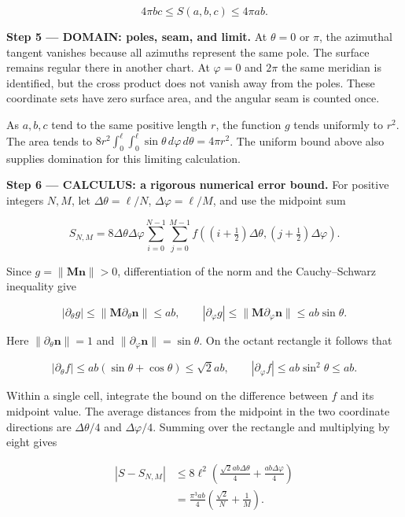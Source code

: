\documentclass[11pt,oneside,openany]{book}
\begin{document}
\[
4\pi bc\le S(a,b,c)\le4\pi ab.
\]

\begin{DomainStep}
\textbf{Step 5 --- DOMAIN: poles, seam, and limit.} At \(\theta=0\) or \(\pi\), the azimuthal tangent vanishes because all azimuths represent the same pole. The surface remains regular there in another chart. At \(\varphi=0\) and \(2\pi\) the same meridian is identified, but the cross product does not vanish away from the poles. These coordinate sets have zero surface area, and the angular seam is counted once.

As \(a,b,c\) tend to the same positive length \(r\), the function \(g\) tends uniformly to \(r^2\). The area tends to \(8r^2\int_0^\ell\int_0^\ell\sin\theta\,d\varphi\,d\theta=4\pi r^2\). The uniform bound above also supplies domination for this limiting calculation.

\end{DomainStep}
\textbf{Step 6 --- CALCULUS: a rigorous numerical error bound.} For positive integers \(N,M\), let \(\Delta\theta=\ell/N\), \(\Delta\varphi=\ell/M\), and use the midpoint sum

\[
S_{N,M}=8\Delta\theta\Delta\varphi
\sum_{i=0}^{N-1}\sum_{j=0}^{M-1}
f\left((i+\tfrac12)\Delta\theta,(j+\tfrac12)\Delta\varphi\right).
\]

Since \(g=\|\mathbf M\mathbf n\|>0\), differentiation of the norm and the Cauchy--Schwarz inequality give

\[
|\partial_\theta g|\le\|\mathbf M\partial_\theta\mathbf n\|\le ab,
\qquad
|\partial_\varphi g|\le\|\mathbf M\partial_\varphi\mathbf n\|\le ab\sin\theta.
\]

Here \(\|\partial_\theta\mathbf n\|=1\) and \(\|\partial_\varphi\mathbf n\|=\sin\theta\). On the octant rectangle it follows that

\[
|\partial_\theta f|\le ab(\sin\theta+\cos\theta)\le\sqrt2ab,
\qquad |\partial_\varphi f|\le ab\sin^2\theta\le ab.
\]

Within a single cell, integrate the bound on the difference between \(f\) and its midpoint value. The average distances from the midpoint in the two coordinate directions are \(\Delta\theta/4\) and \(\Delta\varphi/4\). Summing over the rectangle and multiplying by eight gives

\[
\begin{aligned}
|S-S_{N,M}|
&\le8\ell^2\left(\frac{\sqrt2ab\Delta\theta}{4}
+\frac{ab\Delta\varphi}{4}\right)\\
&=\frac{\pi^3ab}{4}\left(\frac{\sqrt2}{N}+\frac1M\right).
\end{aligned}
\]
\end{document}
